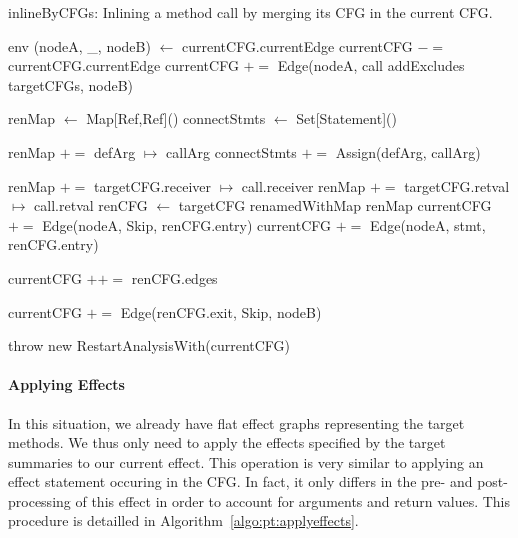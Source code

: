 \documentclass[a4paper]{article}
\begin{document}
\begin{algorithm}
\caption{inlineByCFGs: Inlining a method call by merging its CFG in the current CFG.}\label{algo:pt:inlinebycfg}
\begin{algorithmic}[1]
        \State \Return env
    \Else
        \State (nodeA, \_, nodeB) $\gets$ currentCFG.currentEdge
        \State currentCFG $-=$ currentCFG.currentEdge
        \State currentCFG $+=$ Edge(nodeA, call addExcludes targetCFGs, nodeB)

            \State renMap $\gets$ Map[Ref,Ref]()
            \State connectStmts $\gets$ Set[Statement]()
            \State

                    \State renMap $+=$ defArg $\mapsto$ callArg
                \Else
                    \State connectStmts $+=$ Assign(defArg, callArg)
                \EndIf

            \EndFor
            \State
            \State renMap $+=$ targetCFG.receiver $\mapsto$ call.receiver
            \State renMap $+=$ targetCFG.retval   $\mapsto$ call.retval
            \State
            \State renCFG $\gets$ targetCFG renamedWithMap renMap
            \State
                \State currentCFG $+=$ Edge(nodeA, Skip, renCFG.entry)
            \Else
                    \State currentCFG $+=$ Edge(nodeA, stmt, renCFG.entry)
                \EndFor
            \EndIf

            \State currentCFG $++=$ renCFG.edges

            \State currentCFG $+=$ Edge(renCFG.exit, Skip, nodeB)
        \EndFor

        \State throw new RestartAnalysisWith(currentCFG)
    \EndIf
\EndFunction
\end{algorithmic}
\end{algorithm}

\FloatBarrier

\paragraph{Applying Effects}

In this situation, we already have flat effect graphs representing the
target methods. We thus only need to apply the effects specified by the target
summaries to our current effect. This operation is very similar to applying an
effect statement occuring in the CFG. In fact, it only differs in the pre- and
post-processing of this effect in order to account for arguments and return
values. This procedure is detailled in Algorithm~\ref{algo:pt:applyeffects}.
\end{document}
